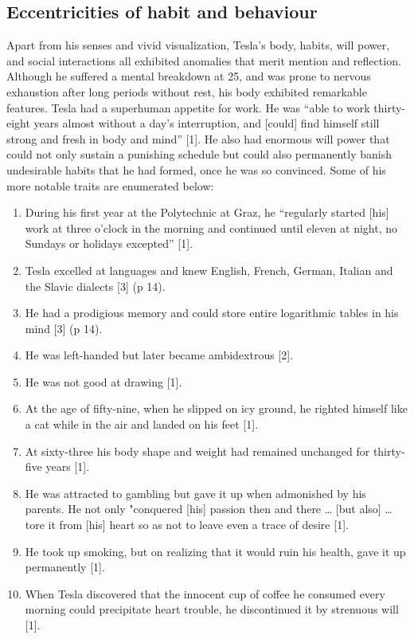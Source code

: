 \documentclass[
  12pt,
  british,
  a4paper,
]{article}
\providecommand{\tightlist}{%
  \setlength{\itemsep}{0pt}\setlength{\parskip}{0pt}}
\begin{document}
\hypertarget{eccentricities-of-habit-and-behaviour}{%
\subsection{Eccentricities of habit and
behaviour}\label{eccentricities-of-habit-and-behaviour}}

Apart from his senses and vivid visualization, Tesla's body, habits,
will power, and social interactions all exhibited anomalies that merit
mention and reflection. Although he suffered a mental breakdown at 25,
and was prone to nervous exhaustion after long periods without rest, his
body exhibited remarkable features. Tesla had a superhuman appetite for
work. He was ``able to work thirty-eight years almost without a day's
interruption, and {[}could{]} find himself still strong and fresh in
body and mind'' {[}1{]}. He also had enormous will power that could not
only sustain a punishing schedule but could also permanently banish
undesirable habits that he had formed, once he was so convinced. Some of
his more notable traits are enumerated below:

\begin{enumerate}
\tightlist
\item
  During his first year at the Polytechnic at Graz, he ``regularly
  started {[}his{]} work at three o'clock in the morning and continued
  until eleven at night, no Sundays or holidays excepted'' {[}1{]}.
\item
  Tesla excelled at languages and knew English, French, German, Italian
  and the Slavic dialects {[}3{]} (p 14).
\item
  He had a prodigious memory and could store entire logarithmic tables
  in his mind {[}3{]} (p 14).
\item
  He was left-handed but later became ambidextrous {[}2{]}.
\item
  He was not good at drawing {[}1{]}.
\item
  At the age of fifty-nine, when he slipped on icy ground, he righted
  himself like a cat while in the air and landed on his feet {[}1{]}.
\item
  At sixty-three his body shape and weight had remained unchanged for
  thirty-five years {[}1{]}.
\item
  He was attracted to gambling but gave it up when admonished by his
  parents. He not only "conquered {[}his{]} passion then and there
  \ldots{} {[}but also{]} \ldots{} tore it from {[}his{]} heart so as
  not to leave even a trace of desire {[}1{]}.
\item
  He took up smoking, but on realizing that it would ruin his health,
  gave it up permanently {[}1{]}.
\item
  When Tesla discovered that the innocent cup of coffee he consumed
  every morning could precipitate heart trouble, he discontinued it by
  strenuous will {[}1{]}.
\end{enumerate}
\end{document}
